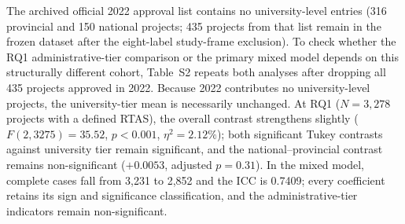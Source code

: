 \documentclass[a4paper,11pt]{article}
\begin{document}

The archived official 2022 approval list contains no university-level entries (316 provincial and 150 national projects; 435 projects from that list remain in the frozen dataset after the eight-label study-frame exclusion). To check whether the RQ1 administrative-tier comparison or the primary mixed model depends on this structurally different cohort, Table~S2 repeats both analyses after dropping all 435 projects approved in 2022. Because 2022 contributes no university-level projects, the university-tier mean is necessarily unchanged. At RQ1 ($N=3{,}278$ projects with a defined RTAS), the overall contrast strengthens slightly ($F(2,3275)=35.52$, $p<0.001$, $\eta^2=2.12\%$); both significant Tukey contrasts against university tier remain significant, and the national--provincial contrast remains non-significant ($+0.0053$, adjusted $p=0.31$). In the mixed model, complete cases fall from 3,231 to 2,852 and the ICC is 0.7409; every coefficient retains its sign and significance classification, and the administrative-tier indicators remain non-significant.
\end{document}
